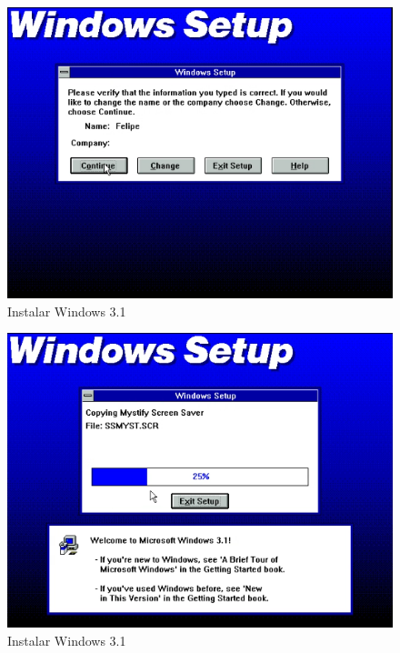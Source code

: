 \documentclass{report}
\begin{document}
\begin{figure}
\centering
\includegraphics[width=\textwidth]{Screenshot_30.png}
\caption{Instalar Windows 3.1}
\label{fig:30}
\end{figure}

\begin{figure}
\centering
\includegraphics[width=\textwidth]{Screenshot_31.png}
\caption{Instalar Windows 3.1}
\label{fig:31}
\end{figure}
\end{document}
